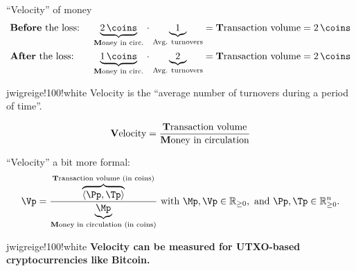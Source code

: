 
\begin{frame}{``Velocity'' of money}
  \begin{align*}%
    &\textbf{Before}\text{ the loss: } &\underbrace{2\,\coins}_{\text{\textbf{M}oney in circ.}} \, \cdot \, \underbrace{1}_{\text{Avg. turnovers}} = %
    \text{\textbf{T}ransaction volume} = 2\,\coins\\%
    &\textbf{After}\text{ the loss: }  &\underbrace{1\,\coins}_{\text{\textbf{M}oney in circ.}} \, \cdot \, \underbrace{2}_{\text{Avg. turnovers}} = %
    \text{\textbf{T}ransaction volume} = 2\,\coins%
  \end{align*} %
	\begin{alertblockc}[N]{}{jwigreige!100!white}
		Velocity is the ``average number of turnovers during a period of time''.
	\end{alertblockc}
	\begin{align*}
	  \text{\textbf{V}elocity} = \frac{\text{\textbf{T}ransaction volume}}{\text{\textbf{M}oney in circulation}}
	\end{align*}
\end{frame}

\begin{frame}{``Velocity'' a bit more formal:}
	\centering
	\begin{align*}%
	  \Vp=\frac{
	  \overbrace{\langle\Pp,\Tp\rangle}^{\text{\textbf{T}ransaction volume (in coins)}}
	  }{
	  \underbrace{\Mp}_{\text{\textbf{M}oney in circulation (in coins)}}
	  }
	  \text{ with}\ \Mp, \Vp \in \mathbb{R}_{\ge 0},\ 
	  \text{and}\ \Pp,\Tp \in \mathbb{R}_{\ge 0}^{n}.%
	\end{align*}
	\vspace{1em}
	\begin{alertblockc}[]{}{jwigreige!100!white}
		\textbf{Velocity can be measured for UTXO-based cryptocurrencies like Bitcoin.}
	\end{alertblockc}
\end{frame}


